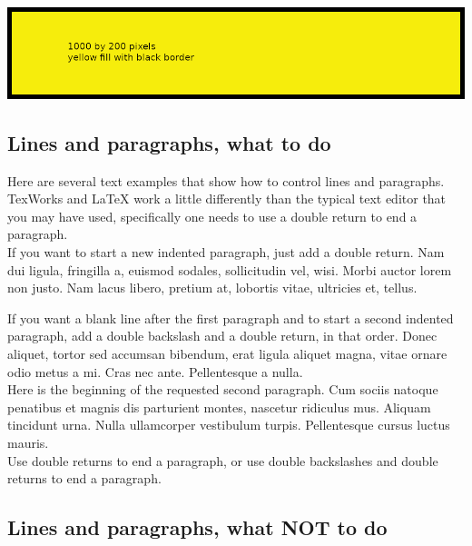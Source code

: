 \includegraphics{1000x200}

\newpage

\subsection*{Lines and paragraphs, what to do}

Here are several text examples that show how to control lines and paragraphs.   TexWorks and LaTeX work a little differently than the typical text editor that you may have used, specifically one needs to use a double return to end a paragraph.\\

If you want to start a new indented paragraph, just add a double return. Nam dui ligula, fringilla a, euismod sodales, sollicitudin vel, wisi.  Morbi auctor lorem non justo. Nam lacus libero, pretium at, lobortis vitae, ultricies et, tellus.

If you want a blank line after the first paragraph and to start a second indented paragraph, add a double backslash and a double return, in that order.  Donec aliquet, tortor sed accumsan bibendum, erat ligula aliquet magna, vitae ornare odio metus a mi.  Cras nec ante. Pellentesque a nulla.\\

Here is the beginning of the requested second paragraph. Cum sociis natoque penatibus et magnis dis parturient montes, nascetur ridiculus mus. Aliquam tincidunt urna. Nulla ullamcorper vestibulum turpis. Pellentesque cursus luctus mauris.\\

Use double returns to end a paragraph, or use double backslashes and double returns to end a paragraph.

\subsection*{Lines and paragraphs, what NOT to do}

